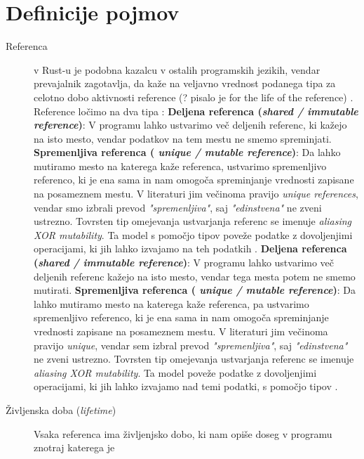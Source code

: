 \documentclass[a4paper,12pt,openright]{book}
\begin{document}
\section{Definicije pojmov}
\begin{description}
	\item[Referenca] v Rust-u je podobna kazalcu v ostalih programskih jezikih, vendar prevajalnik zagotavlja, da kaže
	      na veljavno vrednost podanega tipa za celotno dobo aktivnosti reference (? pisalo je for the life of the reference) \cite{klabnikRustProgrammingLanguage2023}.
	      Reference ločimo na dva tipa \cite{crichtonGroundedConceptualModel2023,yanovskiGhostCellSeparatingPermissions2021,weissOxideEssenceRust2019}:
	      \subitem \textbf{Deljena referenca (\textit{shared / immutable reference})}: V programu lahko ustvarimo več deljenih referenc, ki
	      kažejo na isto mesto, vendar podatkov na tem mestu ne smemo spreminjati.
	      \subitem \textbf{Spremenljiva referenca (\textit{ unique / mutable reference})}: Da lahko mutiramo mesto na katerega kaže
	      referenca, ustvarimo spremenljivo referenco, ki je ena sama in nam omogoča spreminjanje vrednosti zapisane na posameznem mestu.
	      V literaturi jim večinoma pravijo \textit{unique references}, vendar smo izbrali prevod \textit{"spremenljiva"}, saj \textit{"edinstvena"} ne zveni ustrezno.
	      \subitem Tovrsten tip omejevanja ustvarjanja referenc se imenuje \textit{aliasing XOR mutability}. Ta model s pomočjo tipov
	      poveže podatke z dovoljenjimi operacijami, ki jih lahko izvajamo na teh podatkih \cite{yanovskiGhostCellSeparatingPermissions2021}.
	      \subitem \textbf{Deljena referenca (\textit{shared / immutable reference})}: V programu lahko ustvarimo več deljenih referenc
	      kažejo na isto mesto, vendar tega mesta potem ne smemo mutirati.
	      \subitem \textbf{Spremenljiva referenca (\textit{ unique / mutable reference})}: Da lahko mutiramo mesto na katerega kaže
	      referenca, pa ustvarimo spremenljivo referenco, ki je ena sama in nam omogoča spreminjanje vrednosti zapisane na posameznem mestu.
	      V literaturi jim večinoma pravijo \textit{unique}, vendar sem izbral prevod \textit{"spremenljiva"}, saj \textit{"edinstvena"} ne zveni ustrezno.
	      \subitem Tovrsten tip omejevanja ustvarjanja referenc se imenuje \textit{aliasing XOR mutability}. Ta model poveže podatke
	      z dovoljenjimi operacijami, ki jih lahko izvajamo nad temi podatki, s pomočjo tipov \cite{yanovskiGhostCellSeparatingPermissions2021}.
	\item[Življenska doba (\textit{lifetime})] Vsaka referenca ima življenjsko dobo, ki nam opiše doseg v programu znotraj katerega je

\end{description}
\end{document}
